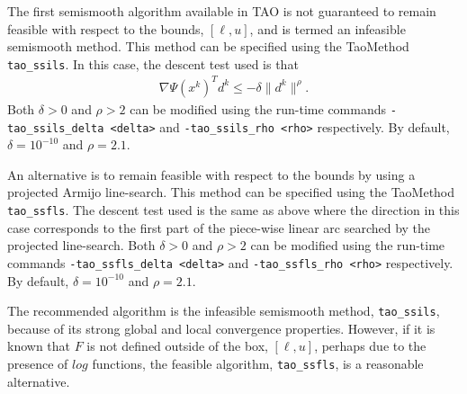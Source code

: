 The first semismooth algorithm available in TAO is not guaranteed to 
remain feasible with respect to the bounds, $[\ell, u]$, and is termed 
an infeasible semismooth method.  This method can be specified using the 
TaoMethod {\tt tao\_ssils}.  In this case, the descent test used is 
that
\begin{eqnarray*}
\nabla \Psi(x^k)^Td^k \leq -\delta\| d^k \|^\rho.
\end{eqnarray*}
Both $\delta > 0$ and $\rho > 2$ can be modified using the
run-time commands {\tt -tao\_ssils\_delta <delta>} and 
{\tt -tao\_ssils\_rho <rho>} respectively. By default, 
$\delta = 10^{-10}$ and $\rho = 2.1$.

An alternative is to remain feasible with respect to the bounds by using a 
projected Armijo line-search.  This method can be specified using the 
TaoMethod {\tt tao\_ssfls}.  The descent test used is the same as above 
where the direction in this case corresponds to the first part of the 
piece-wise linear arc searched by the projected line-search.  
Both $\delta > 0$ and $\rho > 2$ can be modified using the run-time 
commands  {\tt -tao\_ssfls\_delta <delta>} and {\tt -tao\_ssfls\_rho <rho>} 
respectively.  By default, $\delta = 10^{-10}$ and $\rho = 2.1$.

The recommended algorithm is the infeasible semismooth method,
{\tt tao\_ssils}, because of its strong global and local convergence 
properties.  However, if it is known that $F$ is not defined outside 
of the box, $[\ell,u]$, perhaps due to the presence of $log$ functions,
the feasible algorithm, {\tt tao\_ssfls}, is a reasonable alternative.
